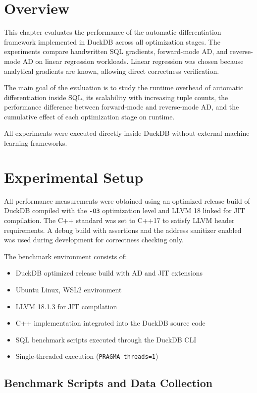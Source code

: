 \documentclass[12pt]{report}
\begin{document}
\section{Overview}

This chapter evaluates the performance of the automatic differentiation
framework implemented in DuckDB across all optimization stages. The experiments
compare handwritten SQL gradients, forward-mode AD, and reverse-mode AD on
linear regression workloads. Linear regression was chosen because analytical
gradients are known, allowing direct correctness verification.

The main goal of the evaluation is to study the runtime overhead of automatic
differentiation inside SQL, its scalability with increasing tuple counts, the
performance difference between forward-mode and reverse-mode AD, and the
cumulative effect of each optimization stage on runtime.

All experiments were executed directly inside DuckDB without external machine
learning frameworks.

\section{Experimental Setup}

All performance measurements were obtained using an optimized release build of
DuckDB compiled with the \texttt{-O3} optimization level and LLVM 18 linked
for JIT compilation. The C++ standard was set to C++17 to satisfy LLVM header
requirements. A debug build with assertions and the address sanitizer enabled
was used during development for correctness checking only.

The benchmark environment consists of:

\begin{itemize}
    \item DuckDB optimized release build with AD and JIT extensions
    \item Ubuntu Linux, WSL2 environment
    \item LLVM 18.1.3 for JIT compilation
    \item C++ implementation integrated into the DuckDB source code
    \item SQL benchmark scripts executed through the DuckDB CLI
    \item Single-threaded execution (\texttt{PRAGMA threads=1})
\end{itemize}

\subsection{Benchmark Scripts and Data Collection}
\end{document}
